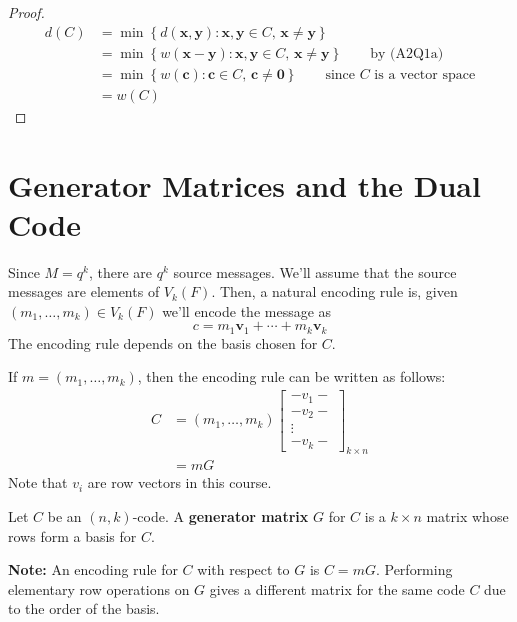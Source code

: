 \begin{proof}
    \begin{align*}
        d(C)
         & =\min \left\{ d(\bm{x},\bm{y}):\bm{x},\bm{y}\in C,\,\bm{x}\neq \bm{y}\right\}                        \\
         & =\min \left\{ w(\bm{x}-\bm{y}):\bm{x},\bm{y}\in C,\,\bm{x}\neq \bm{y}\right\}\qquad\text{by (A2Q1a)} \\
         & =\min
        \left\{ w(\bm{c}):\bm{c}\in C,\,\bm{c}\neq \bm{0}\right\}\qquad\text{since $C$ is a vector space}       \\
         & =w(C)
    \end{align*}
\end{proof}

\section{Generator Matrices and the Dual Code}

Since $ M=q^k $, there are $ q^k $ source messages. We'll assume that the source
messages are elements of $ V_k(F) $. Then, a natural encoding rule is,
given $ (m_1,\ldots ,m_k)\in V_k(F) $ we'll encode the message as
\[ c=m_1\bm{v}_1+\cdots+m_k\bm{v}_k \]
The encoding rule depends on the basis chosen for $ C $.

If $ m=(m_1,\ldots ,m_k) $, then the encoding rule can be written as follows:
\begin{align*}
    C & =(m_1,\ldots ,m_k)
    \begin{bmatrix}
        -v_1-  \\
        -v_2-  \\
        \vdots \\
        -v_k-
    \end{bmatrix}_{k\times n} \\
      & =mG
\end{align*}
Note that $ v_i $ are row vectors in this course.

\begin{defbox}
    \begin{definition}
        Let $ C $ be an $ (n,k) $-code. A \textbf{generator matrix} $ G $
        for $ C $ is a $ k\times n $ matrix whose rows form a basis for $ C $.
    \end{definition} \end{defbox}

\textbf{Note:} An encoding rule for $ C $ with respect to $ G $ is $ C=mG $.
Performing elementary row operations on $ G $ gives
a different matrix for the same code $ C $ due to the order of the basis.
